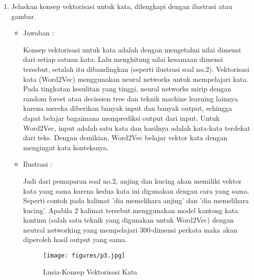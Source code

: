 \begin{enumerate}
\item Jelaskan konsep vektorisasi untuk kata, dilengkapi dengan ilustrasi atau gambar.
	\begin{itemize}
	\item Jawaban :
		\par Konsep vektorisasi untuk kata adalah dengan mengetahui nilai dimensi dari setiap satuan kata. Lalu menghitung nilai kesamaan dimensi tersebut, setalah itu dibandingkan (seperti ilustrasi soal no.2). Vektorisasi kata (Word2Vec) menggunakan neural networks untuk mempelajari kata. Pada tingkatan kesulitan yang tinggi, neural networks mirip dengan random forest atau decission tree dan teknik machine learning lainnya karena mereka diberikan banyak input dan banyak output, sehingga dapat belajar bagaimana memprediksi output dari input. Untuk Word2Vec, input adalah satu kata dan hasilnya adalah kata-kata terdekat dari teks. Dengan demikian, Word2Vec belajar vektor kata dengan mengingat kata konteksnya.
	\item Ilustrasi :
		\par Jadi dari pemaparan soal no.2, anjing dan kucing akan memiliki vektor kata yang sama karena kedua kata ini digunakan dengan cara yang sama. Seperti contoh pada kalimat 'dia memelihara anjing' dan 'dia memelihara kucing'. Apabila 2 kalimat tersebut menggunakan model kantong kata kontinu (salah satu teknik yang digunakan untuk Word2Vec) dengan neutral networking yang mempelajari 300-dimensi perkata maka akan diperoleh hasil output yang sama.
			\begin{figure}[ht]
			\centering
			\texttt{[image: figures/p3.jpg]}
			\caption{Lusia-Konsep Vektorisasi Kata}
			\label{contoh}
			\end{figure}
	\end{itemize}


\end{enumerate}
